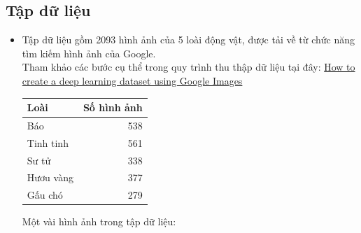 \documentclass[20pt, a4paper]{article}
\begin{document}
\subsection{Tập dữ liệu}
\begin{itemize}
	\item
Tập dữ liệu gồm 2093 hình ảnh của 5 loài động vật, được tải về từ chức năng tìm kiếm hình ảnh của Google.\\
Tham khảo các bước cụ thể trong quy trình thu thập dữ liệu tại đây: \href{https://www.pyimagesearch.com/2017/12/04/how-to-create-a-deep-learning-dataset-using-google-images/}{How to create a deep learning dataset using Google Images}

\begin{tabular}{l | r}
	\textbf{Loài} & \textbf{Số hình ảnh} \\
	\hline
	Báo & 538 \\
	Tinh tinh & 561 \\
	Sư tử & 338 \\
	Hươu vàng & 377 \\
	Gấu chó & 279 \\
\end{tabular}

Một vài hình ảnh trong tập dữ liệu:

\begin{figure}[h!]
	\centering
	\qquad

	\qquad


\end{figure}
\end{itemize}
\end{document}
